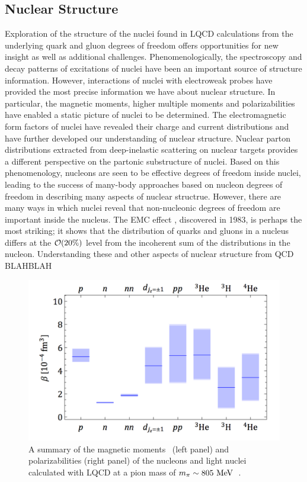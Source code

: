 \subsection{Nuclear Structure}
\label{sec:nuclearstructure}

Exploration of the structure of the nuclei found in LQCD calculations from the underlying quark and gluon degrees of freedom offers  opportunities for new insight as well as additional challenges.  Phenomenologically, the spectroscopy and decay patterns of excitations of nuclei have been an important source of structure information. However, interactions of nuclei with electroweak probes have provided the most precise information we have about nuclear structure. 
In particular, the magnetic moments,  higher multiple moments and polarizabilities  have enabled a static picture of nuclei to be determined. The electromagnetic form factors of nuclei have revealed their charge and current distributions and  have further
developed our understanding of nuclear structure. 
Nuclear parton distributions extracted from deep-inelastic scattering on nuclear targets provides a different perspective on the partonic substructure of nuclei. Based on this phenomenology, nucleons are seen to be effective degrees of freedom inside nuclei, leading to the success of many-body approaches based on nucleon degrees of freedom in describing many aspects of nuclear structrue. However, there are many ways in which nuclei reveal that non-nucleonic degrees of freedom are important inside the nucleus. The EMC effect \cite{Aubert:1983xm}, discovered in 1983, is perhaps the most striking; it shows that the distribution of quarks and gluons in a nucleus differs at the ${\cal O}(20\%)$ level from the incoherent sum of the distributions in the nucleon. Understanding these and other aspects of nuclear structure from QCD  BLAHBLAH

%
\begin{figure}[!t]
	\centering
	\includegraphics[width=0.49\columnwidth]{figures/PhysPols.pdf}
	\caption{ 
		A summary of the magnetic moments~\protect\cite{Beane:2014ora} (left panel) and polarizabilities (right panel) of the nucleons and
		light nuclei calculated with LQCD at a pion mass of
		$m_\pi\sim 805~{\rm MeV}$~\protect\cite{Chang:2015qxa}.    }
	\label{fig:summaryBETA}
\end{figure}


